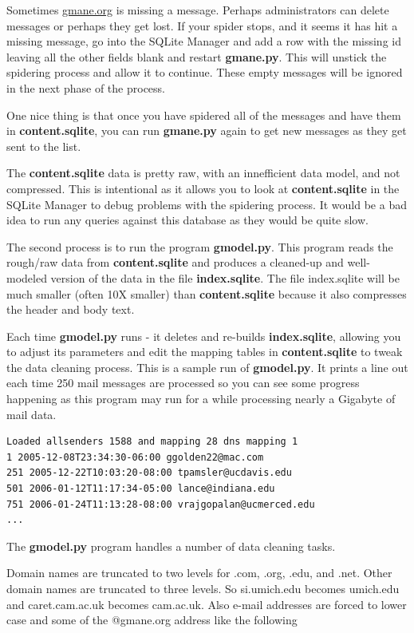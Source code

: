\documentclass[11pt]{book}
\begin{document}
Sometimes \url{gmane.org} is missing a message.  Perhaps administrators can delete messages
or perhaps they get lost.   If your spider stops, and it seems it has hit
a missing message, go into the SQLite Manager and add a row with the missing id leaving
all the other fields blank and restart {\bf gmane.py}.   This will unstick the 
spidering process and allow it to continue.  These empty messages will be ignored in the next
phase of the process.

One nice thing is that once you have spidered all of the messages and have them in 
{\bf content.sqlite}, you can run {\bf gmane.py} again to get new messages as 
they get sent to the list.  

The {\bf content.sqlite} data is pretty raw, with an innefficient data model, 
and not compressed.
This is intentional as it allows you to look at {\bf content.sqlite}
in the SQLite Manager to debug problems with the spidering process.
It would be a bad idea to run any queries against this database as they 
would be quite slow.

The second process is to run the program {\bf gmodel.py}.  This program reads the rough/raw 
data from {\bf content.sqlite} and produces a cleaned-up and well-modeled version of the 
data in the file {\bf index.sqlite}.  The file index.sqlite will be much smaller (often 10X
smaller) than {\bf content.sqlite} because it also compresses the header and body text.

Each time {\bf gmodel.py} runs - it deletes and re-builds {\bf index.sqlite}, allowing
you to adjust its parameters and edit the mapping tables in {\bf content.sqlite} to tweak the 
data cleaning process. This is a sample run of {\bf gmodel.py}.  It prints a line out each time
250 mail messages are processed so you can see some progress happening as this program may
run for a while processing nearly a Gigabyte of mail data.

\beforeverb
\begin{verbatim}
Loaded allsenders 1588 and mapping 28 dns mapping 1
1 2005-12-08T23:34:30-06:00 ggolden22@mac.com
251 2005-12-22T10:03:20-08:00 tpamsler@ucdavis.edu
501 2006-01-12T11:17:34-05:00 lance@indiana.edu
751 2006-01-24T11:13:28-08:00 vrajgopalan@ucmerced.edu
...
\end{verbatim}
\afterverb
%

The {\bf gmodel.py} program handles a number of data cleaning tasks.

Domain names are truncated to two levels for .com, .org, .edu, and .net.
Other domain names are truncated to three levels.  So si.umich.edu becomes
umich.edu and caret.cam.ac.uk becomes cam.ac.uk.   Also e-mail addresses are
forced to lower case and some of the @gmane.org address like the following
\end{document}
